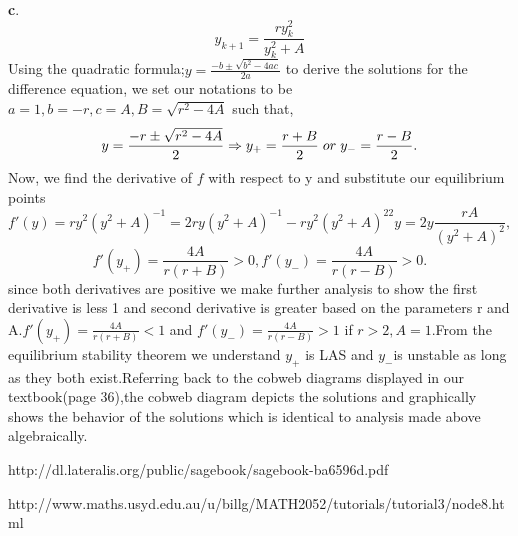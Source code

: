 \documentclass[12pt]{article}
\begin{document}
  
\textbf{c}.\[y_{k+1}=\frac{ry^2_k}{y^2_k+A}\]
Using the quadratic formula;$y=\frac{-b\pm\sqrt{b^2-4ac}}{2a}$ to derive the solutions for the difference equation, we set our notations to be $a=1,b=-r,c=A,B=\sqrt{r^2-4A}$ such that,\[y=\frac{-r\pm\sqrt{r^2-4A}}{2}\Rightarrow y_+=\frac{r+B}{2}\hspace{0.1cm} or\hspace{0.1cm} y_-=\frac{r-B}{2}.\]
Now, we find the derivative of $f$ with respect to y and substitute our equilibrium points\\
\[f'(y)=ry^2(y^2+A)^{-1}=2ry(y^2+A)^{-1}-ry^2(y^2+A)^22y=2y\frac{rA}{(y^2+A)^2},\] 
\[f'(y_+)=\frac{4A}{r(r+B)}>0,f'(y_-)=\frac{4A}{r(r-B)}>0.\] since both derivatives are positive we make further analysis to show the first derivative is less 1 and second derivative is greater based on the parameters r and A.$f'(y_+)=\frac{4A}{r(r+B)}<1$ and $f'(y_-)=\frac{4A}{r(r-B)}>1$  if $r>2,A=1$.From the equilibrium stability theorem we understand $y_+$ is LAS and  $y_-$is unstable as long as they both exist.Referring back to the cobweb diagrams displayed in our textbook(page 36),the cobweb diagram depicts the solutions and graphically shows the behavior of the solutions which is identical to analysis made above algebraically.\vspace{1.0cm}

\cleardoublepage        

 
 




\begin{thebibliography}{99}
http://dl.lateralis.org/public/sagebook/sagebook-ba6596d.pdf

http://www.maths.usyd.edu.au/u/billg/MATH2052/tutorials/tutorial3/node8.html

\end{thebibliography}
\end{document}
